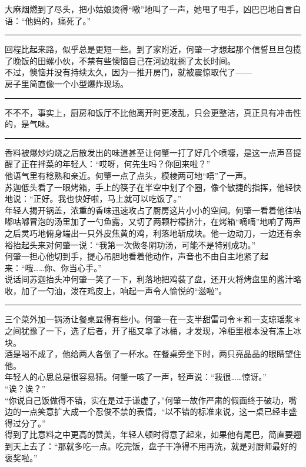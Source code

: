 \documentclass[oneside,11pt]{memoir} %
\begin{document}
\begin{CJK}{UTF8}{gbsn}
    大麻烟燃到了尽头，把小姑娘烫得“嗷”地叫了一声，她甩了甩手，凶巴巴地自言自语：“他妈的，痛死了。”\\\indent
\rule{-3pt}{30pt}
    回程比起来路，似乎总是更短一些。到了家附近，何肇一才想起那个信誓旦旦包揽了晚饭的田螺小伙，不禁有些懊恼自己在河边耽搁了太长时间。\\\indent
    不过，懊恼并没有持续太久，因为一推开房门，就被震惊取代了——\\\indent
    房子里简直像一个小型爆炸现场。\\\indent
\rule{-3pt}{30pt}
    不不不，事实上，厨房和饭厅不比他离开时更凌乱，只会更整洁，真正具有冲击性的，是气味。\\\indent
\rule{-3pt}{30pt}
    香料被爆炒灼烧之后散发出的味道甚至让何肇一打了好几个喷嚏，是这一点声音提醒了正在拌菜的年轻人：“哎呀，何先生吗？你回来啦？”\\\indent
    他语气里有稔熟和亲近。何肇一点了点头，模棱两可地“唔”了一声。\\\indent
    苏迦低头看了一眼烤箱，手上的筷子在半空中划了个圈，像个敏捷的指挥，他轻快地说：“正好。我也快好啦，马上就可以吃饭了。”\\\indent
    年轻人揭开锅盖，浓重的香味迅速攻占了厨房这片小小的空间。何肇一看着他往咕嘟咕嘟冒泡的汤里加了一勺鱼露，又切了两颗柠檬挤汁，在烤箱“嘀嘀”地响了两声之后灵巧地俯身端出一只外皮焦黄的鸡，利落地斩成块。他一边动刀，一边还有余裕抬起头来对何肇一说：“我第一次做冬阴功汤，可能不是特别成功。”\\\indent
    何肇一担心他切到手，提心吊胆地看着他动作，声音也不由自主地紧了起来：“哦……你、你当心手。”\\\indent
    说话间苏迦抬头冲何肇一笑了一下，利落地把鸡装了盘，还开火将烤盘里的酱汁略收，加了一勺油，泼在鸡皮上，响起一声令人愉悦的“滋啦”。\\\indent
\rule{-3pt}{30pt}
    三个菜外加一锅汤让餐桌显得有些小。何肇一在一支半甜雷司令＊和一支琼瑶浆＊之间犹豫了一下，选了后者，开了瓶又拿了冰桶，才发现，冷柜里根本没有冻上冰块。\\\indent
    酒是喝不成了，他给两人各倒了一杯水。在餐桌旁坐下时，两只亮晶晶的眼睛望住他。\\\indent
    年轻人的心思总是很容易猜。何肇一咳了一声，轻声说：“我很……惊讶。”\\\indent
    “诶？诶？”\\\indent
    “你说自己饭做得不错，实在是过于谦虚了，”何肇一故作严肃的假面终于破功，嘴边的一点笑意扩大成一个忍俊不禁的表情，“以不错的标准来说，这一桌已经丰盛得过分了。”\\\indent
    得到了比意料之中更高的赞美，年轻人顿时得意了起来，如果他有尾巴，简直要翘到天上去了：“那就多吃一点。吃完饭，盘子干净得不用再洗，就是对厨师最好的褒奖啦。”\\\indent

\end{CJK}
\end{document}
